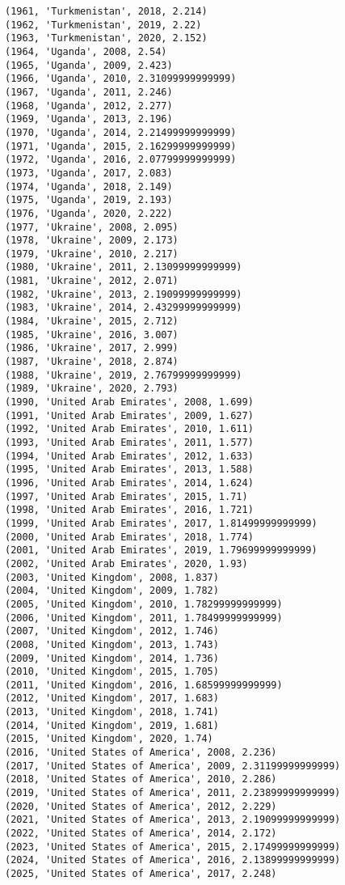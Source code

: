 \documentclass[11pt]{article}
\begin{document}
\begin{Verbatim}[commandchars=\\\{\}]
(1961, 'Turkmenistan', 2018, 2.214)
(1962, 'Turkmenistan', 2019, 2.22)
(1963, 'Turkmenistan', 2020, 2.152)
(1964, 'Uganda', 2008, 2.54)
(1965, 'Uganda', 2009, 2.423)
(1966, 'Uganda', 2010, 2.31099999999999)
(1967, 'Uganda', 2011, 2.246)
(1968, 'Uganda', 2012, 2.277)
(1969, 'Uganda', 2013, 2.196)
(1970, 'Uganda', 2014, 2.21499999999999)
(1971, 'Uganda', 2015, 2.16299999999999)
(1972, 'Uganda', 2016, 2.07799999999999)
(1973, 'Uganda', 2017, 2.083)
(1974, 'Uganda', 2018, 2.149)
(1975, 'Uganda', 2019, 2.193)
(1976, 'Uganda', 2020, 2.222)
(1977, 'Ukraine', 2008, 2.095)
(1978, 'Ukraine', 2009, 2.173)
(1979, 'Ukraine', 2010, 2.217)
(1980, 'Ukraine', 2011, 2.13099999999999)
(1981, 'Ukraine', 2012, 2.071)
(1982, 'Ukraine', 2013, 2.19099999999999)
(1983, 'Ukraine', 2014, 2.43299999999999)
(1984, 'Ukraine', 2015, 2.712)
(1985, 'Ukraine', 2016, 3.007)
(1986, 'Ukraine', 2017, 2.999)
(1987, 'Ukraine', 2018, 2.874)
(1988, 'Ukraine', 2019, 2.76799999999999)
(1989, 'Ukraine', 2020, 2.793)
(1990, 'United Arab Emirates', 2008, 1.699)
(1991, 'United Arab Emirates', 2009, 1.627)
(1992, 'United Arab Emirates', 2010, 1.611)
(1993, 'United Arab Emirates', 2011, 1.577)
(1994, 'United Arab Emirates', 2012, 1.633)
(1995, 'United Arab Emirates', 2013, 1.588)
(1996, 'United Arab Emirates', 2014, 1.624)
(1997, 'United Arab Emirates', 2015, 1.71)
(1998, 'United Arab Emirates', 2016, 1.721)
(1999, 'United Arab Emirates', 2017, 1.81499999999999)
(2000, 'United Arab Emirates', 2018, 1.774)
(2001, 'United Arab Emirates', 2019, 1.79699999999999)
(2002, 'United Arab Emirates', 2020, 1.93)
(2003, 'United Kingdom', 2008, 1.837)
(2004, 'United Kingdom', 2009, 1.782)
(2005, 'United Kingdom', 2010, 1.78299999999999)
(2006, 'United Kingdom', 2011, 1.78499999999999)
(2007, 'United Kingdom', 2012, 1.746)
(2008, 'United Kingdom', 2013, 1.743)
(2009, 'United Kingdom', 2014, 1.736)
(2010, 'United Kingdom', 2015, 1.705)
(2011, 'United Kingdom', 2016, 1.68599999999999)
(2012, 'United Kingdom', 2017, 1.683)
(2013, 'United Kingdom', 2018, 1.741)
(2014, 'United Kingdom', 2019, 1.681)
(2015, 'United Kingdom', 2020, 1.74)
(2016, 'United States of America', 2008, 2.236)
(2017, 'United States of America', 2009, 2.31199999999999)
(2018, 'United States of America', 2010, 2.286)
(2019, 'United States of America', 2011, 2.23899999999999)
(2020, 'United States of America', 2012, 2.229)
(2021, 'United States of America', 2013, 2.19099999999999)
(2022, 'United States of America', 2014, 2.172)
(2023, 'United States of America', 2015, 2.17499999999999)
(2024, 'United States of America', 2016, 2.13899999999999)
(2025, 'United States of America', 2017, 2.248)

\end{Verbatim}
\end{document}

